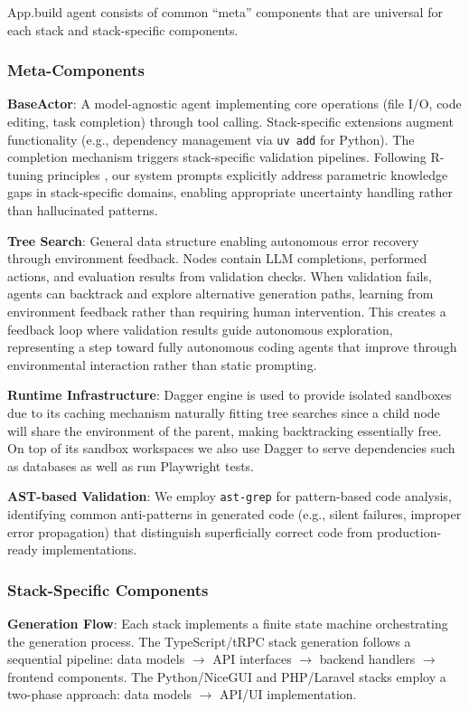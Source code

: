 \documentclass{article}
\begin{document}
App.build agent consists of common ``meta'' components that are universal for each stack and stack-specific components.

\subsubsection{Meta-Components}

\textbf{BaseActor}: A model-agnostic agent implementing core operations (file I/O, code editing, task completion) through tool calling. Stack-specific extensions augment functionality (e.g., dependency management via \texttt{uv add} for Python). The completion mechanism triggers stack-specific validation pipelines. Following R-tuning principles \citep{zhang2023rtuning}, our system prompts explicitly address parametric knowledge gaps in stack-specific domains, enabling appropriate uncertainty handling rather than hallucinated patterns.

\textbf{Tree Search}: General data structure enabling autonomous error recovery through environment feedback. Nodes contain LLM completions, performed actions, and evaluation results from validation checks. When validation fails, agents can backtrack and explore alternative generation paths, learning from environment feedback rather than requiring human intervention. This creates a feedback loop where validation results guide autonomous exploration, representing a step toward fully autonomous coding agents that improve through environmental interaction rather than static prompting.

\textbf{Runtime Infrastructure}: Dagger engine is used to provide isolated sandboxes due to its caching mechanism naturally fitting tree searches since a child node will share the environment of the parent, making backtracking essentially free. On top of its sandbox workspaces we also use Dagger to serve dependencies such as databases as well as run Playwright tests.

\textbf{AST-based Validation}: We employ \texttt{ast-grep} for pattern-based code analysis, identifying common anti-patterns in generated code (e.g., silent failures, improper error propagation) that distinguish superficially correct code from production-ready implementations.

\subsubsection{Stack-Specific Components}

\textbf{Generation Flow}: Each stack implements a finite state machine orchestrating the generation process. The TypeScript/tRPC stack generation follows a sequential pipeline: data models $\rightarrow$ API interfaces $\rightarrow$ backend handlers $\rightarrow$ frontend components. The Python/NiceGUI and PHP/Laravel stacks employ a two-phase approach: data models $\rightarrow$ API/UI implementation.
\end{document}
